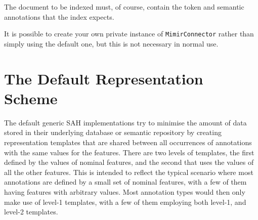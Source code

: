 The document to be indexed must, of course, contain the token and semantic
annotations that the index expects.

It is possible to create your own private instance of
\lstinline!MimirConnector! rather than simply using the default one, but this
is not necessary in normal use.

\section{The Default Representation Scheme}\label{sec:indexing:dsah-detail}

The default generic SAH implementations try to minimise the amount of data
stored in their underlying database or semantic repository by creating
representation templates that are shared between all occurrences of annotations
with the same values for the features. There are two levels of templates, the
first defined by the values of nominal features, and the second that uses the
values of all the other features. This is intended to reflect the typical
scenario where most annotations are defined by a small set of nominal features,
with a few of them having features with arbitrary values. Most annotation types
would then only make use of level-1 templates, with a few of them employing both
level-1, and level-2 templates.

